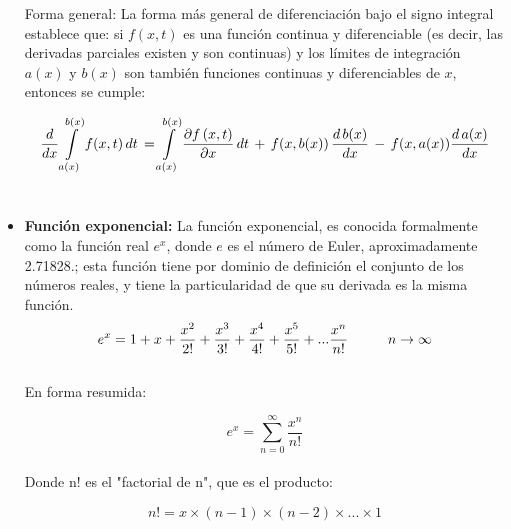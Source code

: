 \documentclass[letterpaper, 12pt]{article}
\begin{document}
\begin{itemize}
        Forma general: La forma más general de diferenciación bajo el signo integral establece que: si $f(x, t)$ es una función continua y diferenciable (es decir, las derivadas parciales existen y son continuas) y los límites de integración $a(x)$ y $b(x)$ son también funciones continuas y diferenciables de $x$, entonces se cumple:
        
            \begin{equation*}
                \frac{d}{dx} \int\limits_{a(x)}^{b(x)} f(x,t) \thinspace dt \thinspace = \int\limits_{a(x)}^{b(x)} \frac{\partial f \thinspace (x,t)}{\partial x} \thinspace dt \thinspace + \thinspace f(x,b(x)) \thinspace \frac{d \thinspace b(x)}{dx} \thinspace - \thinspace f(x,a(x)) \frac{d \thinspace a(x)}{dx}
            \end{equation*}\\
            
        \item \textbf{Función exponencial:} La función exponencial, es conocida formalmente como la función real $e^{x}$, donde $e$ es el número de Euler, aproximadamente 2.71828.; esta función tiene por dominio de definición el conjunto de los números reales, y tiene la particularidad de que su derivada es la misma función.  \\
        
            \begin{equation*}
                e^{x} = 1 + x + \frac{x^2}{2!} + \frac{x^3}{3!} + \frac{x^4}{4!} + \frac{x^5}{5!} + ... \frac{x^n}{n!} \hspace{1 cm} n \rightarrow \infty
            \end{equation*}\\    
            
        En forma resumida: 
        
            \begin{equation*}
                e^{x} = \sum\limits_{n=0}^{\infty} \frac{x^n}{n!}
            \end{equation*}\\  
            
        Donde n! es el "factorial de n", que es el producto: 
        
            \begin{equation*}
                n! = x \times (n-1) \times (n-2) \times ... \times 1 
            \end{equation*}\\  
            

\end{itemize}
\end{document}
